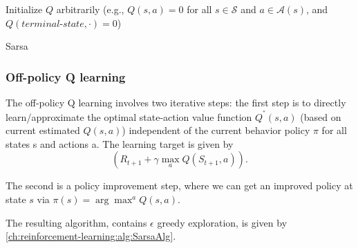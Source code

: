 \begin{refsection}
\begin{algorithm}\label{ch:reinforcement-learning:alg:SarsaAlg}
	Initialize $Q$ arbitrarily (e.g., $Q(s,a) = 0$ for all $s\in\mathcal{S}$ and $a\in\mathcal{A}(s)$, and $Q(terminal\text{-}state, \cdot)=0$) \\
	\caption{Sarsa}
\end{algorithm}


\subsubsection{Off-policy Q learning}

The off-policy Q learning involves two iterative steps:
the first step is to directly learn/approximate the optimal state-action value function $Q^^*(s, a)$ (based on current estimated $Q(s,a)$) independent of the current behavior
policy $\pi$ for all states s and actions a. The learning target is given by
$$(R_{t+1} + \gamma \max_{a}Q(S_{t+1}, a)).$$

The second is a policy improvement step, where we can get an improved policy at state $s$ via
$\pi(s) = \arg\max^{a} Q(s,a)$.

The resulting algorithm, contains $\epsilon$ greedy exploration, is given by \autoref{ch:reinforcement-learning:alg:SarsaAlg}.

\begin{algorithm}[H]
	\SetAlgoLined
	
\end{algorithm}
\end{refsection}

